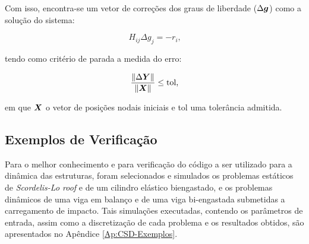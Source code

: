 Com isso, encontra-se um vetor de correções dos graus de liberdade ($\Delta\boldsymbol{g}$) como a solução do sistema:

\begin{equation}
    H_{ij}\Delta g_j=-r_i\text{,}
\end{equation}

\noindent tendo como critério de parada a medida do erro:

\begin{equation}
    \frac{\left\lVert{\Delta\boldsymbol{Y}}\right\lVert}{\left\lVert{\boldsymbol{X}}\right\lVert}\leq\text{tol,}
    \label{eq:CSD-erro}
\end{equation}

\noindent em que $\boldsymbol{X}$ o vetor de posições nodais iniciais e tol uma tolerância admitida.

%
%

\subsection{Exemplos de Verificação} \label{MEFP-Ex}

Para o melhor conhecimento e para verificação do código a ser utilizado para a dinâmica das estruturas, foram selecionados e simulados os problemas estáticos de \textit{Scordelis-Lo roof} e de um cilindro elástico biengastado, e os problemas dinâmicos de uma viga em balanço e de uma viga bi-engastada submetidas a carregamento de impacto. Tais simulações executadas, contendo os parâmetros de entrada, assim como a discretização de cada problema e os resultados obtidos, são apresentados no Apêndice \ref{Ap:CSD-Exemplos}. %
